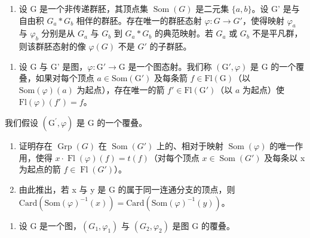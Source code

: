 \begin{enumerate}
\def\labelenumi{\alph{enumi})}
\setcounter{enumi}{1}
\tightlist
\item
  设 G 是一个非传递群胚，其顶点集 \(\operatorname{Som}(G)\) 是二元集 \(\{a,b\}\)。设 G' 是与自由积 \(G_a*G_b\) 相伴的群胚。存在唯一的群胚态射 \(\varphi:G\to G'\)，使得映射 \(\varphi_a\) 与 \(\varphi_b\) 分别是从 \(G_a\) 与 \(G_b\) 到 \(G_a*G_b\) 的典范映射。若 \(G_a\) 或 \(G_b\) 不是平凡群，则该群胚态射的像 \(\varphi(G)\) 不是 \(G'\) 的子群胚。
\end{enumerate}

\begin{enumerate}
\def\labelenumi{\arabic{enumi})}
\setcounter{enumi}{5}
\tightlist
\item
  设 G 与 G' 是图，\(\varphi\colon\mathrm{G}'\to\mathrm{G}\) 是一个图态射。我们称 \((\mathrm{G}',\varphi)\) 是 G 的一个覆叠，如果对每个顶点 \(a\in\mathrm{Som}(\mathrm{G}')\) 及每条箭 \(f\in\mathrm{Fl}(\mathrm{G})\)（以 \(\mathrm{Som}(\varphi)(a)\) 为起点），存在唯一的箭 \(f'\in\mathrm{Fl}(\mathrm{G}')\)（以 \(a\) 为起点）使 \(\mathrm{Fl}(\varphi)(f')=f\)。
\end{enumerate}

我们假设 \((\mathrm{G}^{\prime},\varphi)\) 是 G 的一个覆叠。

\begin{enumerate}
\def\labelenumi{\alph{enumi})}
\item
  证明存在 \(\operatorname{Grp}(G)\) 在 \(\operatorname{Som}(G')\) 上的、相对于映射 \(\operatorname{Som}(\varphi)\) 的唯一作用，使得 \(x \cdot \operatorname{Fl}(\varphi)(f) = t(f)\)（对每个顶点 \(x \in \operatorname{Som}(G')\) 及每条以 x 为起点的箭 \(f \in \operatorname{Fl}(G')\)）。
\item
  由此推出，若 x 与 y 是 G 的属于同一连通分支的顶点，则 \(\text{Card}(\text{Som}(\varphi)^{-1}(x)) = \text{Card}(\text{Som}(\varphi)^{-1}(y))\)。
\end{enumerate}

\begin{enumerate}
\def\labelenumi{\arabic{enumi})}
\setcounter{enumi}{6}
\tightlist
\item
  设 G 是一个图，\((G_{1},\varphi_{1})\) 与 \((G_{2},\varphi_{2})\) 是图 G 的覆叠。
\end{enumerate}

